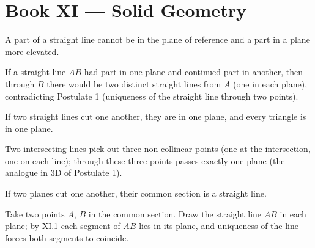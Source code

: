 %
%

\section{Book XI --- Solid Geometry}
\label{sec:book-XI}

\begin{claim}
\label{prop:XI.1}
A part of a straight line cannot be in the plane of reference and a
part in a plane more elevated.
\end{claim}
\begin{evidence}[Proof of XI.1]
\label{ev:XI.1}
If a straight line $AB$ had part in one plane and continued part in
another, then through $B$ there would be two distinct straight lines
from $A$ (one in each plane), contradicting Postulate 1 (uniqueness
of the straight line through two points).
\end{evidence}

\begin{claim}
\label{prop:XI.2}
If two straight lines cut one another, they are in one plane, and
every triangle is in one plane.
\end{claim}
\begin{evidence}[Proof of XI.2]
\label{ev:XI.2}
Two intersecting lines pick out three non-collinear points (one at
the intersection, one on each line); through these three points
passes exactly one plane (the analogue in 3D of Postulate 1).
\end{evidence}

\begin{claim}
\label{prop:XI.3}
If two planes cut one another, their common section is a straight
line.
\end{claim}
\begin{evidence}[Proof of XI.3]
\label{ev:XI.3}
Take two points $A$, $B$ in the common section.  Draw the straight
line $AB$ in each plane; by XI.1 each segment of $AB$ lies in its
plane, and uniqueness of the line forces both segments to coincide.
\end{evidence}


